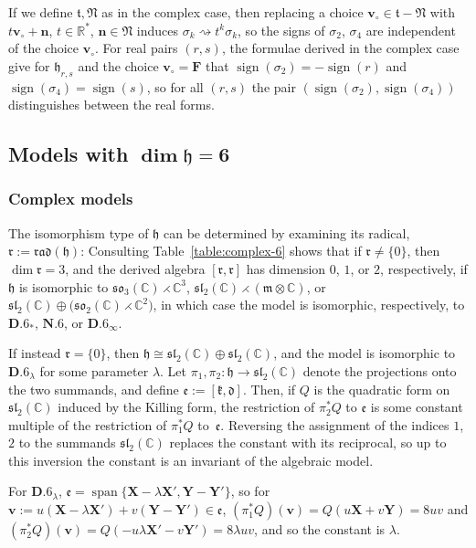 \documentclass[10pt,a4paper]{amsart}
\DeclareMathOperator{\sign}{sign}
\DeclareMathOperator{\spanOperator}{span}
\newcommand{\Span}[1]{\spanOperator\{{#1}\}}
\newcommand{\bbC}{\mathbb{C}}
\newcommand{\bbR}{\mathbb{R}}
\newcommand{\mbF}{\mathbf{F}}
\newcommand{\mbv}{\mathbf{v}}
\newcommand{\mbX}{\mathbf{X}}
\newcommand{\mbY}{\mathbf{Y}}
\newcommand{\mfd} {\mathfrak{d}}
\newcommand{\mfe} {\mathfrak{e}}
\newcommand{\mfh} {\mathfrak{h}}
\newcommand{\mfk} {\mathfrak{k}}
\newcommand{\mfm} {\mathfrak{m}}
\newcommand{\mfN} {\mathfrak{N}}
\newcommand{\mfr} {\mathfrak{r}}
\newcommand{\mft} {\mathfrak{t}}
\newcommand{\mfrad}{\mathfrak{rad}}
\newcommand{\mfsl} {\mathfrak{sl}}
\newcommand{\mfso} {\mathfrak{so}}
\numberwithin{equation}{section}
\begin{document}
If we define $\mft, \mfN$ as in the complex case, then replacing a choice $\mbv_{\circ} \in \mft - \mfN$ with $t \mbv_{\circ} + \mathbf{n}$, $t \in \bbR^*$, $\mathbf{n} \in \mfN$ induces $\sigma_k \rightsquigarrow t^k \sigma_k$, so the signs of $\sigma_2$, $\sigma_4$ are independent of the choice $\mbv_{\circ}$. For real pairs $(r, s)$, the formulae derived in the complex case give for $\mfh_{r, s}$ and the choice $\mbv_{\circ} = \mbF$ that $\sign(\sigma_2) = -\sign(r)$ and $\sign(\sigma_4) = \sign(s)$, so for all $(r, s)$ the pair $(\sign(\sigma_2), \sign(\sigma_4))$ distinguishes between the real forms.

\subsection[Models with $\dim \mfh = 6$]{Models with $\boldsymbol{\dim \mfh = 6}$}\label{subsection:identification-6}

\subsubsection{Complex models}\label{subsubsection:identification-6-complex} The isomorphism type of $\mfh$ can be determined by examining its radical, $\mfr := \mfrad(\mfh)$: Consulting Table~\ref{table:complex-6} shows that if $\mfr \neq \{ 0 \}$, then $\dim \mfr = 3$, and the derived algebra $[\mfr, \mfr]$ has dimension $0$, $1$, or $2$, respectively, if $\mfh$ is isomorphic to $\mfso_3(\bbC) \rightthreetimes \bbC^3$, $\mfsl_2(\bbC) \rightthreetimes (\mfm \otimes \bbC)$, or $\mfsl_2(\bbC) \oplus \big(\mfso_2(\bbC) \rightthreetimes \bbC^2\big)$, in which case the model is isomorphic, respectively, to $\mathbf{D.6}_{\ast}$, $\mathbf{N.6}$, or $\mathbf{D.6}_{\infty}$.

If instead $\mfr = \{ 0 \}$, then $\mfh \cong \mfsl_2(\bbC) \oplus \mfsl_2(\bbC)$, and the model is isomorphic to $\mathbf{D.6}_{\lambda}$ for some parameter $\lambda$. Let $\pi_1, \pi_2 \colon \mfh \to \mfsl_2(\bbC)$ denote the projections onto the two summands, and define $\mfe := [\mfk, \mfd]$. Then, if $Q$ is the quadratic form on $\mfsl_2(\bbC)$ induced by the Killing form, the restriction of $\pi_2^* Q$ to $\mfe$ is some constant multiple of the restriction of $\pi_1^* Q$ to~$\mfe$. Reversing the assignment of the indices $1$, $2$ to the summands $\mfsl_2(\bbC)$ replaces the constant with its reciprocal, so up to this inversion the constant is an invariant of the algebraic model.

For $\mathbf{D.6}_{\lambda}$, $\mfe = \Span{\mbX - \lambda \mbX', \mbY - \mbY'}$, so for $\mbv := u(\mbX -\lambda \mbX') + v (\mbY - \mbY') \in \mfe$, $(\pi_1^* Q)(\mbv) = Q(u \mbX + v \mbY) = 8 u v$ and $(\pi_2^* Q)(\mbv) = Q(-u \lambda \mbX' - v \mbY') = 8 \lambda u v$, and so the constant is $\lambda$.
\end{document}
